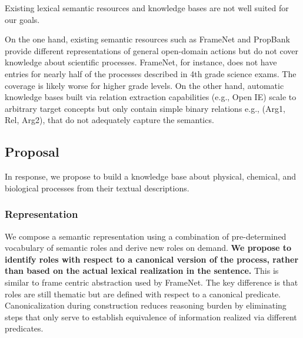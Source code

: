Existing lexical semantic resources and knowledge bases are not well suited for our goals.

On the one hand, existing semantic resources such as FrameNet and PropBank provide different representations of 
general open-domain actions but do not cover knowledge about scientific processes. 
FrameNet, for instance, does not have entries for nearly half of the processes described in 4th grade science exams. 
The coverage is likely worse for higher grade levels. 
On the other hand, automatic knowledge bases built via relation extraction
capabilities (e.g., Open IE) scale to arbitrary target concepts but only contain simple binary relations e.g., (Arg1, Rel, Arg2), that do not adequately capture the semantics.

\subsection{Proposal}

In response, we propose to build a knowledge base about physical, chemical, and biological processes from their textual descriptions. 

\subsubsection*{Representation}
We compose a semantic representation using a combination of pre-determined vocabulary of semantic roles and derive new roles on demand.
{\bf We propose to identify roles with respect to a canonical version of the process, rather than based on the actual lexical realization in the sentence.}
This is similar to frame centric abstraction used by FrameNet. The key difference is that roles are still thematic but are defined with respect to a canonical predicate.
Canonicalization during construction reduces reasoning burden by eliminating steps that only serve to establish equivalence of information realized via different predicates.

